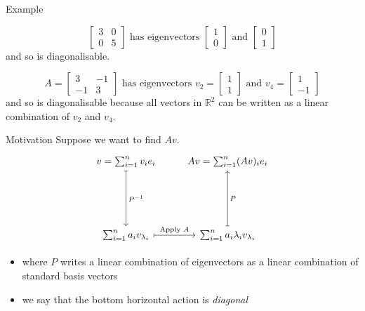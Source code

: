 \documentclass{beamer}
\begin{document}
\begin{frame}{Example}
\begin{example}
	\begin{equation*}
	\left[
	\begin{matrix}
	3&0\\
	0&5
	\end{matrix}
	\right]
	\text{ has eigenvectors }
	\left[
	\begin{matrix}
	1\\
	0
	\end{matrix}
	\right]\text{ and }
	\left[
	\begin{matrix}
	0\\
	1
	\end{matrix}
	\right]
	\end{equation*}
	and so is diagonalisable.
\end{example}
\begin{example}
	\begin{equation*}
		A = \left[\begin{matrix}
			3 & -1\\
			-1 & 3
		\end{matrix}\right]
	\text{ has eigenvectors }
	v_2 = \left[
	\begin{matrix}
	1\\
	1
	\end{matrix}
	\right]\text{ and }
	v_4 = \left[
	\begin{matrix}
	1\\
	-1
	\end{matrix}
	\right]
	\end{equation*}
	and so is diagonalisable because all vectors in $\mathbb{R}^2$ can be written as a linear combination of $v_2$ and $v_4$.
\end{example}
\end{frame}

\begin{frame}[fragile]{Motivation}
Suppose we want to find $Av$.
{\LARGE
\begin{equation*}
\begin{tikzcd}[row sep = 2cm]
v = \sum_{i=1}^n v_i e_i \dar[mapsto]{P^{-1}} & Av = \sum_{i=1}^n (Av)_i e_i\\
\sum_{i=1}^n a_i v_{\lambda_i} \rar[mapsto]{\text{Apply }A} & \sum_{i=1}^n a_i\lambda_i v_{\lambda_i} \uar[mapsto][swap]{P}
\end{tikzcd}
\end{equation*}
}
\begin{itemize}
	\item where $P$ writes a linear combination of eigenvectors as a linear combination of standard basis vectors
	\item we say that the bottom horizontal action is \emph{diagonal}
\end{itemize}
\end{frame}
\end{document}
